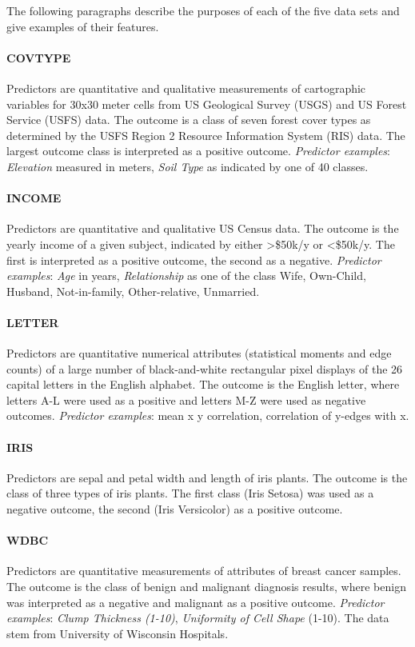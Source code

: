 \documentclass[twoside,11pt]{article}
\begin{document}
			The following paragraphs describe the purposes of each of the five data sets and give examples of their features.
			
			\paragraph{COVTYPE}
			Predictors are quantitative and qualitative measurements of cartographic variables for 30x30 meter cells from US Geological Survey (USGS) and US Forest Service (USFS) data. The outcome is a class of seven forest cover types as determined by the USFS Region 2 Resource Information System (RIS) data. The largest outcome class is interpreted as a positive outcome. \textit{Predictor examples}: \textit{Elevation} measured in meters, \textit{Soil Type} as indicated by one of 40 classes.
			
			\paragraph{INCOME}
			Predictors are quantitative and qualitative US Census data. The outcome is the yearly income of a given subject, indicated by either >\$50k/y or <\$50k/y. The first is interpreted as a positive outcome, the second as a negative. \textit{Predictor examples}: \textit{Age} in years, \textit{Relationship} as one of the class Wife, Own-Child, Husband, Not-in-family, Other-relative, Unmarried.
			
			\paragraph{LETTER}
			Predictors are quantitative numerical attributes (statistical moments and edge counts) of a large number of black-and-white rectangular pixel displays of the 26 capital letters in the English alphabet. The outcome is the English letter, where letters A-L were used as a positive and letters M-Z were used as negative outcomes. \textit{Predictor examples}: mean x y correlation, correlation of y-edges with x.
			
			\paragraph{IRIS}
			Predictors are sepal and petal width and length of iris plants. The outcome is the class of three types of iris plants. The first class (Iris Setosa) was used as a negative outcome, the second (Iris Versicolor) as a positive outcome.
			
			\paragraph{WDBC}
			Predictors are quantitative measurements of attributes of breast cancer samples. The outcome is the class of benign and malignant diagnosis results, where benign was interpreted as a negative and malignant as a positive outcome. \textit{Predictor examples}: \textit{Clump Thickness (1-10)}, \textit{Uniformity of Cell Shape} (1-10). The data stem from University of Wisconsin Hospitals.
			
\end{document}
